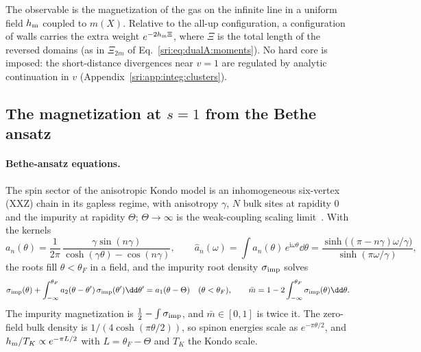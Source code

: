 The observable is the magnetization of the gas on the infinite line in a uniform field $h_{\rm m}$ coupled to $m(X)$.
Relative to the all-up configuration, a configuration of walls carries the extra weight $e^{-2h_{\rm m}\Xi}$, where
$\Xi$ is the total length of the reversed domains (as in $\Xi_{2m}$ of Eq.~\eqref{sri:eq:dualA:moments}). No hard core is
imposed: the short-distance divergences near $v=1$ are regulated by analytic continuation in $v$
(Appendix~\ref{sri:app:integ:clusters}).

\subsection{The magnetization at \texorpdfstring{$s=1$}{s=1} from the Bethe ansatz}\label{sri:app:integ:BA}
\paragraph{Bethe-ansatz equations.} The spin sector of the anisotropic Kondo model is an inhomogeneous six-vertex
(XXZ) chain in its gapless regime, with anisotropy $\gamma$, $N$ bulk sites at rapidity $0$ and the impurity at
rapidity $\Theta$; $\Theta\to\infty$ is the weak-coupling scaling limit~\cite{sri:Andrei:1983,sri:Tsvelick:1983}. With the
kernels
\begin{equation}
 a_n(\theta)=\frac1{2\pi}\,\frac{\gamma\sin(n\gamma)}{\cosh(\gamma\theta)-\cos(n\gamma)},\qquad
 \hat a_n(\omega)=\int a_n(\theta)\,e^{\mathrm i\omega\theta}\dd\theta
 =\frac{\sinh\bigl((\pi-n\gamma)\omega/\gamma\bigr)}{\sinh(\pi\omega/\gamma)},
\end{equation}
the roots fill $\theta<\theta_F$ in a field, and the impurity root density $\sigma_{\rm imp}$ solves
\begin{equation}
 \sigma_{\rm imp}(\theta)+\int_{-\infty}^{\theta_F}a_2(\theta-\theta')\,\sigma_{\rm imp}(\theta')\dd\theta'
 =a_1(\theta-\Theta)\quad(\theta<\theta_F),\qquad
 \bar m=1-2\int_{-\infty}^{\theta_F}\sigma_{\rm imp}(\theta)\dd\theta .
 \label{sri:eq:integ:BAE}
\end{equation}
The impurity magnetization is $\frac12-\int\sigma_{\rm imp}$, and $\bar m\in[0,1]$ is twice it. The zero-field bulk
density is $1/(4\cosh(\pi\theta/2))$, so spinon energies scale as $e^{-\pi\theta/2}$, and $h_{\rm m}/T_K\propto
e^{-\pi L/2}$ with $L=\theta_F-\Theta$ and $T_K$ the Kondo scale.

